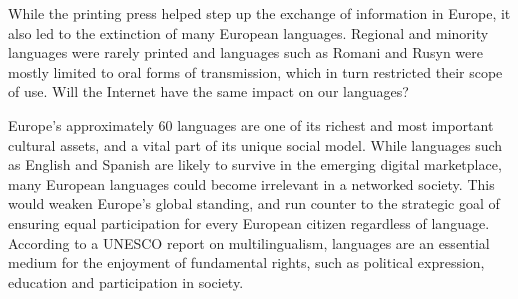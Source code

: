 While the printing press helped step up the exchange of information in Europe, it also led to the extinction of many European languages. Regional and minority languages were rarely printed and languages such as Romani and Rusyn were mostly limited to oral forms of transmission, which in turn restricted their scope of use. Will the Internet have the same impact on our languages?

Europe’s approximately 60 languages are one of its richest and most important cultural assets, and a vital part of its unique social model. While languages such as English and Spanish are likely to survive in the emerging digital marketplace, many European languages could become irrelevant in a networked society. This would weaken Europe’s global standing, and run counter to the strategic goal of ensuring equal participation for every European citizen regardless of language. According to a UNESCO report on multilingualism, languages are an essential medium for the enjoyment of fundamental rights, such as political expression, education and participation in society.
